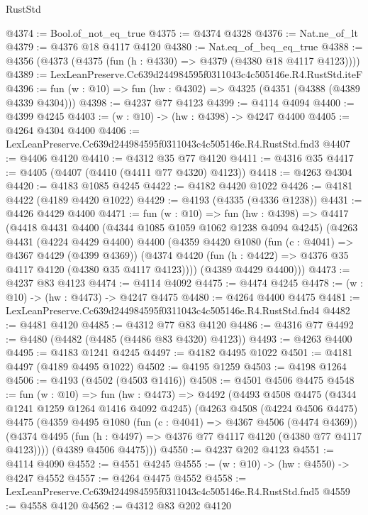 \begin{lexlean}{RustStd}
\begin{coremodule}
@4374 := Bool.of_not_eq_true
@4375 := @4374 @4328
@4376 := Nat.ne_of_lt
@4379 := @4376 @18 @4117 @4120
@4380 := Nat.eq_of_beq_eq_true
@4388 := @4356 (@4373 (@4375 (fun (h : @4330) => @4379 (@4380 @18 @4117 @4123))))
@4389 := LexLeanPreserve.Cc639d244984595f0311043c4c505146e.R4.RustStd.iteF
@4396 := fun (w : @10) => fun (hw : @4302) => @4325 (@4351 (@4388 (@4389 @4339 @4304)))
@4398 := @4237 @77 @4123
@4399 := @4114 @4094
@4400 := @4399 @4245
@4403 := (w : @10) -> (hw : @4398) -> @4247 @4400
@4405 := @4264 @4304 @4400
@4406 := LexLeanPreserve.Cc639d244984595f0311043c4c505146e.R4.RustStd.fnd3
@4407 := @4406 @4120
@4410 := @4312 @35 @77 @4120
@4411 := @4316 @35
@4417 := @4405 (@4407 (@4410 (@4411 @77 @4320) @4123))
@4418 := @4263 @4304
@4420 := @4183 @1085 @4245
@4422 := @4182 @4420 @1022
@4426 := @4181 @4422 (@4189 @4420 @1022)
@4429 := @4193 (@4335 (@4336 @1238))
@4431 := @4426 @4429 @4400
@4471 := fun (w : @10) =>
  fun (hw : @4398) =>
  @4417
    (@4418
      @4431
      @4400
      (@4344 @1085 @1059 @1062 @1238 @4094 @4245)
      (@4263
        @4431
        (@4224 @4429 @4400)
        @4400
        (@4359
          @4420
          @1080
          (fun (c : @4041) => @4367 @4429 (@4399 @4369))
          (@4374 @4420 (fun (h : @4422) => @4376 @35 @4117 @4120 (@4380 @35 @4117 @4123))))
        (@4389 @4429 @4400)))
@4473 := @4237 @83 @4123
@4474 := @4114 @4092
@4475 := @4474 @4245
@4478 := (w : @10) -> (hw : @4473) -> @4247 @4475
@4480 := @4264 @4400 @4475
@4481 := LexLeanPreserve.Cc639d244984595f0311043c4c505146e.R4.RustStd.fnd4
@4482 := @4481 @4120
@4485 := @4312 @77 @83 @4120
@4486 := @4316 @77
@4492 := @4480 (@4482 (@4485 (@4486 @83 @4320) @4123))
@4493 := @4263 @4400
@4495 := @4183 @1241 @4245
@4497 := @4182 @4495 @1022
@4501 := @4181 @4497 (@4189 @4495 @1022)
@4502 := @4195 @1259
@4503 := @4198 @1264
@4506 := @4193 (@4502 (@4503 @1416))
@4508 := @4501 @4506 @4475
@4548 := fun (w : @10) =>
  fun (hw : @4473) =>
  @4492
    (@4493
      @4508
      @4475
      (@4344 @1241 @1259 @1264 @1416 @4092 @4245)
      (@4263
        @4508
        (@4224 @4506 @4475)
        @4475
        (@4359
          @4495
          @1080
          (fun (c : @4041) => @4367 @4506 (@4474 @4369))
          (@4374 @4495 (fun (h : @4497) => @4376 @77 @4117 @4120 (@4380 @77 @4117 @4123))))
        (@4389 @4506 @4475)))
@4550 := @4237 @202 @4123
@4551 := @4114 @4090
@4552 := @4551 @4245
@4555 := (w : @10) -> (hw : @4550) -> @4247 @4552
@4557 := @4264 @4475 @4552
@4558 := LexLeanPreserve.Cc639d244984595f0311043c4c505146e.R4.RustStd.fnd5
@4559 := @4558 @4120
@4562 := @4312 @83 @202 @4120

\end{coremodule}
\end{lexlean}
